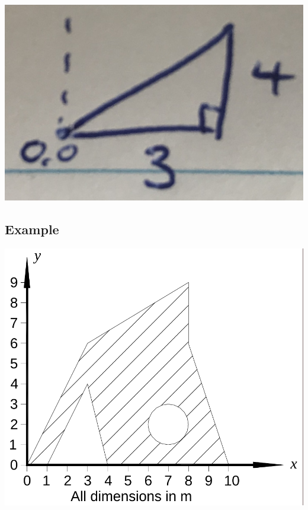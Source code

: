 \documentclass[a4paper, 12pt]{article}
\begin{document}
\begin{center}
\includegraphics[scale=0.05]{triangle}
\end{center}

\subsection{Example}
\includegraphics[scale=0.15]{centroids}
\end{document}
